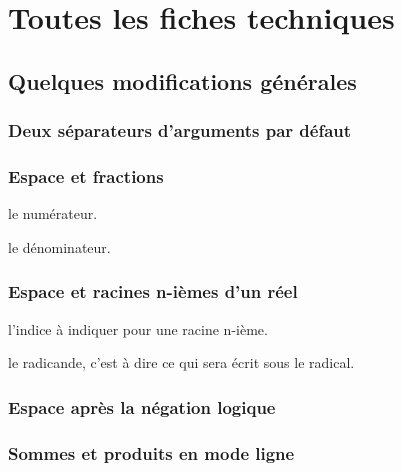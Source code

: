 \documentclass[12pt,a4paper]{article}
\theoremstyle{definition}
\newcommand\extraspace{
	\vspace{0.25em}
}
\begin{document}
\newpage
\section{Toutes les fiches techniques} \label{techincal-ids}


\subsection{Quelques modifications générales}

\subsubsection{Deux séparateurs d'arguments par défaut}



\subsubsection{Espace et fractions}



\extraspace




 le numérateur.

 le dénominateur.
\subsubsection{Espace et racines n-ièmes d'un réel}




\IDoption{} l'indice à indiquer pour une racine n-ième.

\IDarg{} le radicande, c'est à dire ce qui sera écrit sous le radical.
\subsubsection{Espace après la négation logique}


\subsubsection{Sommes et produits en mode ligne}
\end{document}
